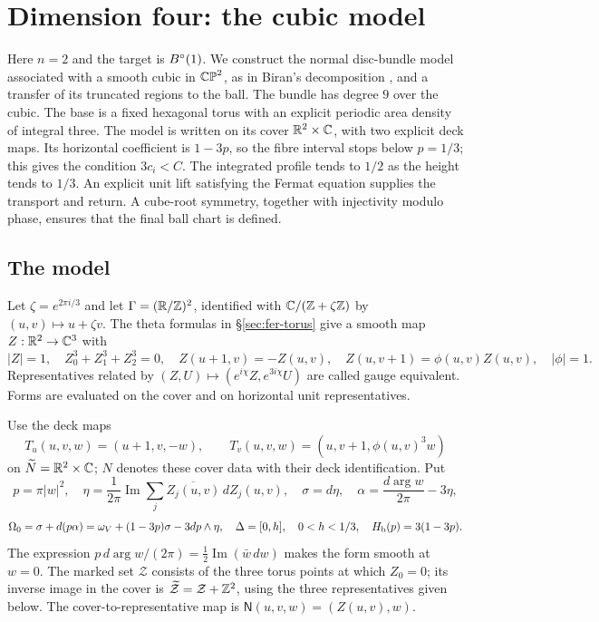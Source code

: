 \section{Dimension four: the cubic model}\label{sec:cub}

Here $n=2$ and the target is $B^{\circ}(1)$. We construct the normal disc-bundle model associated with a smooth cubic
in $\mathbb{CP}^2$, as in Biran's decomposition \cite{Biran2001}, and a transfer of its truncated regions to the ball.
The bundle has degree $9$ over the cubic. The base is a fixed hexagonal torus with an explicit periodic area density
of integral three. The model is written on its cover $\mathbb{R}^2\times\mathbb{C}$, with two explicit deck maps.
Its horizontal coefficient is $1-3p$, so the fibre interval stops below $p=1/3$; this gives the condition $3c_i<C$.
The integrated profile tends to $1/2$ as the height tends to $1/3$.
An explicit unit lift satisfying the Fermat equation supplies the transport and return. A cube-root symmetry,
together with injectivity modulo phase, ensures that the final ball chart is defined.

\subsection{The model}

Let $\zeta=e^{2\pi i/3}$ and let $\Gamma=(\mathbb{R}/\mathbb{Z})^2$, identified with
$\mathbb{C}/(\mathbb{Z}+\zeta\mathbb{Z})$ by $(u,v)\mapsto u+\zeta v$.
The theta formulas in \S\ref{sec:fer-torus} give a smooth map $Z:\mathbb{R}^2\to\mathbb{C}^3$ with
\[
 |Z|=1,\quad Z_0^3+Z_1^3+Z_2^3=0,\quad
 Z(u+1,v)=-Z(u,v),\quad Z(u,v+1)=\phi(u,v)Z(u,v),\quad |\phi|=1.
\]
Representatives related by $(Z,U)\mapsto(e^{i\chi}Z,e^{3i\chi}U)$ are called gauge equivalent.
Forms are evaluated on the cover and on horizontal unit representatives.

\begin{definition}\label{def:cub-model}
Use the deck maps
\[
 T_u(u,v,w)=(u+1,v,-w),\qquad T_v(u,v,w)=(u,v+1,\phi(u,v)^3w)
\]
on $\widetilde N=\mathbb{R}^2\times\mathbb{C}$; $N$ denotes these cover data with their deck identification.
Put
\[
 p=\pi|w|^2,\quad \eta=\frac{1}{2\pi}\operatorname{Im}\sum_j\overline{Z_j(u,v)}\,dZ_j(u,v),\quad
 \sigma=d\eta,\quad \alpha=\frac{d\arg w}{2\pi}-3\eta,
\]
\[
 \Omega_0=\sigma+d(p\alpha)
 =\omega_V+(1-3p)\sigma-3dp\wedge\eta,\quad
 \Delta=[0,h],\quad 0<h<1/3,\quad H_{\mathrm b}(p)=3(1-3p).
\]
The expression $p\,d\arg w/(2\pi)=\frac12\operatorname{Im}(\bar w\,dw)$ makes the form smooth at $w=0$.
The marked set $\mathcal Z$ consists of the three torus points at which $Z_0=0$; its inverse image in the cover is
$\widetilde{\mathcal Z}=\mathcal Z+\mathbb{Z}^2$, using the three representatives given below.
The cover-to-representative map is $\mathsf N(u,v,w)=(Z(u,v),w)$.
\end{definition}

